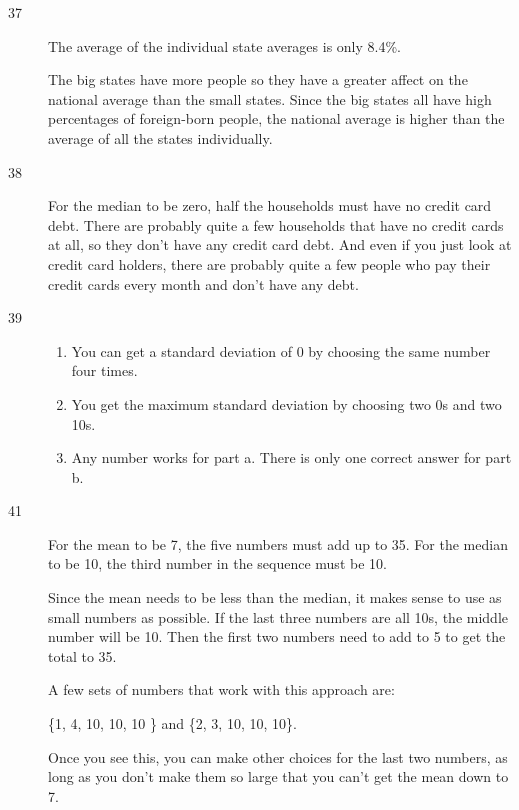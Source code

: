 \documentclass[letterpaper, landscape]{exam}
\begin{document}
\begin{description}
\begin{enumerate}[a]
        \end{enumerate}

      \item[37]
        The average of the individual state averages is only 8.4\%.

        The big states have more people so they have a greater affect on the
        national average than the small states.  Since the big states all have
        high percentages of foreign-born people, the national average is higher
        than the average of all the states individually.

      \item[38]
        For the median to be zero, half the households must have no credit card
        debt.  There are probably quite a few households that have no credit
        cards at all, so they don't have any credit card debt.  And even if you
        just look at credit card holders, there are probably quite a few people
        who pay their credit cards every month and don't have any debt.

      \item[39]
        \begin{enumerate}
          \item You can get a standard deviation of 0 by choosing the same number four times.

          \item You get the maximum standard deviation by choosing two 0s and two 10s.

          \item Any number works for part a.  There is only one correct answer for part b.
        \end{enumerate}

      \item[41]
        For the mean to be 7, the five numbers must add up to 35.  For the
        median to be 10, the third number in the sequence must be 10.

        Since the mean needs to be less than the median, it makes sense to use
        as small numbers as possible.  If the last three numbers are all 10s,
        the middle number will be 10.  Then the first two numbers need to add
        to 5 to get the total to 35.

        A few sets of numbers that work with this approach are: 
        
        \{1, 4, 10, 10, 10 \} and \{2, 3, 10, 10, 10\}.

        Once you see this, you can make other choices for the last two numbers,
        as long as you don't make them so large that you can't get the mean
        down to 7.  


\end{description}
\end{document}

